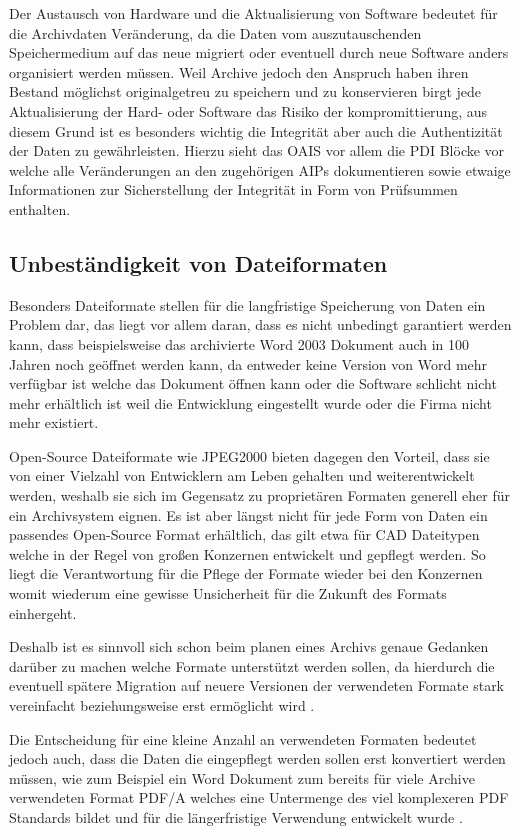 \documentclass[conference,compsoc,final,a4paper]{IEEEtran}
\begin{document}
Der Austausch von Hardware und die Aktualisierung von Software bedeutet für die Archivdaten Veränderung, da die Daten vom auszutauschenden Speichermedium auf das neue migriert oder eventuell durch neue Software anders organisiert werden müssen. Weil Archive jedoch den Anspruch haben ihren Bestand möglichst originalgetreu zu speichern und zu konservieren birgt jede Aktualisierung der Hard- oder Software das Risiko der kompromittierung, aus diesem Grund ist es besonders wichtig die Integrität aber auch die Authentizität der Daten zu gewährleisten. Hierzu sieht das \ac{OAIS} vor allem die \ac{PDI} Blöcke vor welche alle Veränderungen an den zugehörigen \ac{AIP}s dokumentieren sowie etwaige Informationen zur Sicherstellung der Integrität in Form von Prüfsummen enthalten.

\subsection{Unbeständigkeit von Dateiformaten}
Besonders Dateiformate stellen für die langfristige Speicherung von Daten ein Problem dar, das liegt vor allem daran, dass es nicht unbedingt garantiert werden kann, dass beispielsweise das archivierte Word 2003 Dokument auch in 100 Jahren noch geöffnet werden kann, da entweder keine Version von Word mehr verfügbar ist welche das Dokument öffnen kann oder die Software schlicht nicht mehr erhältlich ist weil die Entwicklung eingestellt wurde oder die Firma nicht mehr existiert.

Open-Source Dateiformate wie JPEG2000 bieten dagegen den Vorteil, dass sie von einer Vielzahl von Entwicklern am Leben gehalten und weiterentwickelt werden, weshalb sie sich im Gegensatz zu proprietären Formaten generell eher für ein Archivsystem eignen. Es ist aber längst nicht für jede Form von Daten ein passendes Open-Source Format erhältlich, das gilt etwa für \ac{CAD} Dateitypen welche in der Regel von großen Konzernen entwickelt und gepflegt werden. So liegt die Verantwortung für die Pflege der Formate wieder bei den Konzernen womit wiederum eine gewisse Unsicherheit für die Zukunft des Formats einhergeht. 

Deshalb ist es sinnvoll sich schon beim planen eines Archivs genaue Gedanken darüber zu machen welche Formate unterstützt werden sollen, da hierdurch die eventuell spätere Migration auf neuere Versionen der verwendeten Formate stark vereinfacht beziehungsweise erst ermöglicht wird \autocite{dpcFormatsStandards}.

Die Entscheidung für eine kleine Anzahl an verwendeten Formaten bedeutet jedoch auch, dass die Daten die eingepflegt werden sollen erst konvertiert werden müssen, wie zum Beispiel ein Word Dokument zum bereits für viele Archive verwendeten Format \acs{PDF}/A welches eine Untermenge des viel komplexeren \acs{PDF} Standards bildet und für die längerfristige Verwendung entwickelt wurde \autocite{Strodl2007}.
\end{document}
